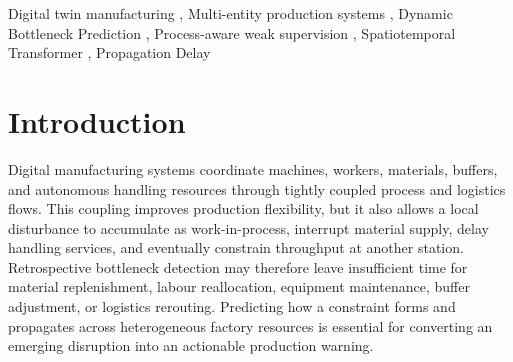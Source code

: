 \documentclass[a4paper,fleqn]{cas-dc}
\newcommand{\zhpara}[1]{%
  \par\begingroup\small\color{black!72}\noindent #1\par\endgroup}
\begin{document}
\begin{abstract}
\zhpara{动态瓶颈预测能够在吞吐约束影响生产之前发出预警，并为资源调整和生产干预提供依据，对实际生产具有重要意义。
本文研究的不仅是未来哪一资源、哪一工位会成为瓶颈，还包括瓶颈何时开始、持续多久、与何种可观测生产状态相关，以及订单尚需多长时间完成。
现有研究主要关注机器或工位传感器返回的单一实体数据，对人员、物料、缓冲区和物流等其他资源实体及其相互联系表征不足。
这种观测范围使工厂图建模不充分，降低预测准确性，也难以刻画扰动经过一定时延后在不同资源之间传播并形成瓶颈的过程。
为解决上述问题，本文提出\textbf{面向延迟传播的过程启发式异构图时空 Transformer（PHGST-DP）}。
可控扰动的数字化生产线提供可追溯的多资源轨迹，过程启发式规则与持续性过滤构造持续性瓶颈事件和过程原因目标，确定性生成的原因对齐工况标识则提供额外运营上下文。
在此基础上，PHGST-DP 将异构工艺—物流图与延迟模式模块结合起来；该模块将短时间片段聚类为重复模式原型，并利用这些原型调节跨资源交互，从而将较早出现的资源状态与随后形成的瓶颈联系起来。
模型最终联合输出瓶颈工位、开始时间、持续时间、过程原因和订单剩余时间。
统一测试样本上的多模型比较与消融实验表明，PHGST-DP 在事件识别、提前预警、状态跟踪和持续时间估计方面表现最优，其优势与异构跨资源建模、过程启发式监督和延迟模式条件化相关；同时，测试硬件上的报告生成耗时满足生产更新周期。
上述结果验证了 PHGST-DP 在所研究数字孪生条件下的有效性，可为实际生产中的资源重调度、物料补充、设备维护和物流调整提供预警与决策支持。}
\end{abstract}

\begin{keywords}
Digital twin manufacturing \sep
Multi-entity production systems \sep
Dynamic Bottleneck Prediction \sep
Process-aware weak supervision \sep
Spatiotemporal Transformer \sep
Propagation Delay
\end{keywords}

\begin{NoHyper}
\maketitle
\end{NoHyper}

\section{Introduction} \label{sec:intro}

Digital manufacturing systems coordinate machines, workers, materials, buffers, and autonomous handling resources through tightly coupled process and logistics flows. This coupling improves production flexibility, but it also allows a local disturbance to accumulate as work-in-process, interrupt material supply, delay handling services, and eventually constrain throughput at another station. Retrospective bottleneck detection may therefore leave insufficient time for material replenishment, labour reallocation, equipment maintenance, buffer adjustment, or logistics rerouting. Predicting how a constraint forms and propagates across heterogeneous factory resources is essential for converting an emerging disruption into an actionable production warning.
\end{document}
